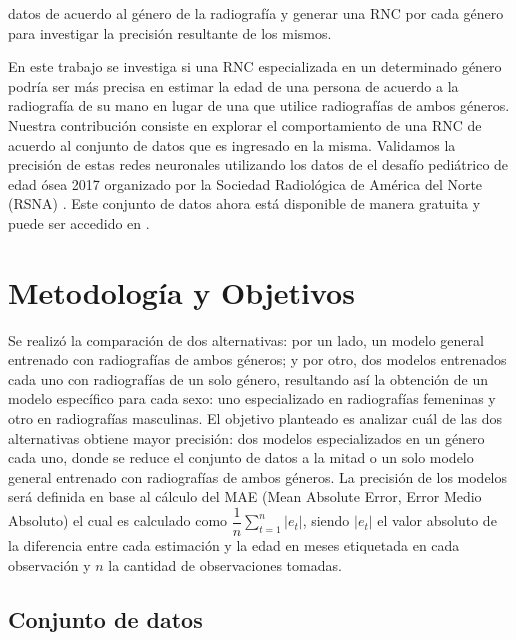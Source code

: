 \documentclass[conference]{IEEEtran}
\begin{document}
datos de acuerdo al género de la radiografía y generar una RNC por cada género para investigar la precisión resultante de los mismos. 

En este trabajo se investiga si una RNC especializada en un determinado género podría ser más precisa en estimar la edad de una persona de acuerdo a la radiografía de su mano en lugar de una que utilice radiografías de ambos géneros. Nuestra contribución consiste en explorar el comportamiento de una RNC de acuerdo al conjunto de datos que es ingresado en la misma. Validamos la precisión de estas redes neuronales utilizando los datos de el desafío pediátrico de edad ósea 2017 organizado por la Sociedad Radiológica de América del Norte (RSNA) \cite{RSNAChallenge}. Este conjunto de datos ahora está disponible de manera gratuita y puede ser accedido en \cite{RSNADataSet}.

\section{Metodología y Objetivos}

Se realizó la comparación de dos alternativas: por un lado, un modelo general entrenado con radiografías de ambos géneros; y por otro, dos modelos entrenados cada uno con radiografías de un solo género, resultando así la obtención de un modelo específico para cada sexo: uno especializado en radiografías femeninas y otro en radiografías masculinas. El objetivo planteado es analizar cuál de las dos alternativas obtiene mayor precisión: dos modelos especializados en un género cada uno, donde se reduce el conjunto de datos a la mitad o un solo modelo general entrenado con radiografías de ambos géneros. La precisión de los modelos será definida en base al cálculo del MAE (Mean Absolute Error, Error Medio Absoluto) el cual es calculado como $\dfrac{1}{n}\sum\limits_{t=1}^{n}|e_t|$, siendo $|e_t|$ el valor absoluto de la diferencia entre cada estimación y la edad en meses etiquetada en cada observación y $n$ la cantidad de observaciones tomadas.

\subsection{Conjunto de datos}
\end{document}
